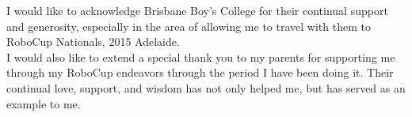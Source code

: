 I would like to acknowledge Brisbane Boy's College for their continual support and generosity, especially in the area of allowing me to travel with them to RoboCup Nationals, 2015 Adelaide.\\
        
I would also like to extend a special thank you to my parents for supporting me through my RoboCup endeavors through the period I have been doing it. Their continual love, support, and wisdom has not only helped me, but has served as an example to me.\\